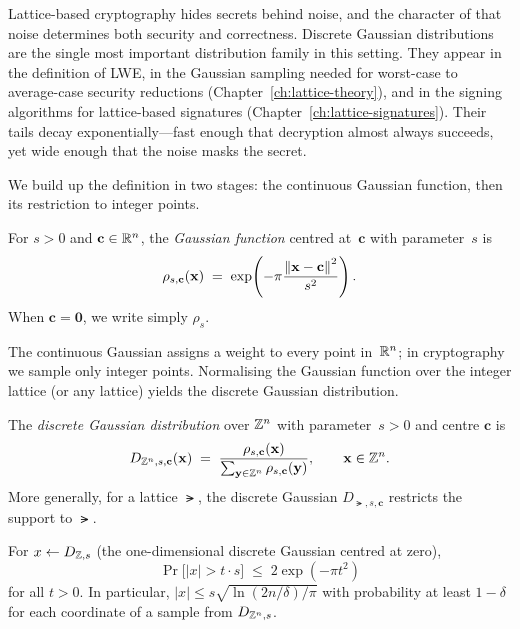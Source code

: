 Lattice-based cryptography hides secrets behind noise, and the character of that noise determines both security and correctness.  Discrete Gaussian distributions are the single most important distribution family in this setting.  They appear in the definition of LWE, in the Gaussian sampling needed for worst-case to average-case security reductions (Chapter~\ref{ch:lattice-theory}), and in the signing algorithms for lattice-based signatures (Chapter~\ref{ch:lattice-signatures}).  Their tails decay exponentially---fast enough that decryption almost always succeeds, yet wide enough that the noise masks the secret.

We build up the definition in two stages: the continuous Gaussian function, then its restriction to integer points.

\begin{definition}
\label{def:gaussian-func}
For $s > 0$ and $\mathbf{c} \in \mathbb{R}^n$, the \emph{Gaussian function} centred at~$\mathbf{c}$ with parameter~$s$ is
\begin{equation}
\label{eq:gaussian-func}
\rho_{s,\mathbf{c}}(\mathbf{x}) \;=\; \exp\!\left(-\pi \frac{\left\lVert \mathbf{x} - \mathbf{c} \right\rVert^2}{s^2}\right).
\end{equation}
When $\mathbf{c} = \mathbf{0}$, we write simply $\rho_s$.
\end{definition}

The continuous Gaussian assigns a weight to every point in~$\mathbb{R}^n$; in cryptography we sample only integer points.  Normalising the Gaussian function over the integer lattice (or any lattice) yields the discrete Gaussian distribution.

\begin{definition}
\label{def:discrete-gaussian}
The \emph{discrete Gaussian distribution} over $\mathbb{Z}^n$ with parameter~$s > 0$ and centre $\mathbf{c}$ is
\begin{equation}
\label{eq:discrete-gaussian}
D_{\mathbb{Z}^n, s, \mathbf{c}}(\mathbf{x}) \;=\; \frac{\rho_{s,\mathbf{c}}(\mathbf{x})}{\sum_{\mathbf{y} \in \mathbb{Z}^n} \rho_{s,\mathbf{c}}(\mathbf{y})}, \qquad \mathbf{x} \in \mathbb{Z}^n.
\end{equation}
More generally, for a lattice $\lat$, the discrete Gaussian $D_{\lat, s, \mathbf{c}}$ restricts the support to $\lat$.
\end{definition}

\begin{theorem}
\label{thm:gaussian-tail}
For $x \gets D_{\mathbb{Z}, s}$ (the one-dimensional discrete Gaussian centred at zero),
\begin{equation}
\label{eq:gaussian-tail}
\Pr\bigl[|x| > t \cdot s\bigr] \;\leq\; 2\exp(-\pi t^2)
\end{equation}
for all $t > 0$.  In particular, $|x| \leq s\sqrt{\ln(2n/\delta)/\pi}$ with probability at least $1 - \delta$ for each coordinate of a sample from $D_{\mathbb{Z}^n, s}$.
\end{theorem}


